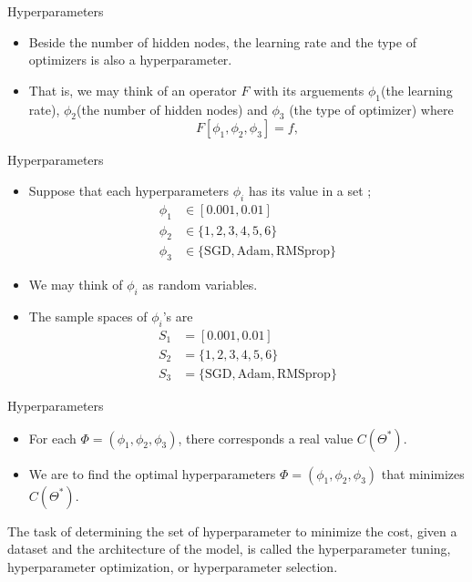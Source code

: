 \documentclass{beamer}
\begin{document}
%
\begin{frame}{Hyperparameters}
\begin{itemize}
\item
Beside the number of hidden nodes, the \alert{learning rate} and the \alert{type of optimizers} is also a hyperparameter.
\item
That is, we may think of an operator \(F\) with its arguements \(\phi_1\)(the learning rate), \(\phi_2\)(the number of hidden nodes) and \(\phi_3\) (the type of optimizer) where
\[F[\phi_1,\phi_2,\phi_3]=f,\]
\end{itemize}
\end{frame}

%
\begin{frame}{Hyperparameters}
\begin{itemize}
\item
Suppose that each hyperparameters \(\phi_i\) has its value in a set ;
\begin{align*}
\phi_1&\in[0.001,0.01]\\
\phi_2&\in\{1,2,3,4,5,6\}\\
\phi_3&\in\{\text{SGD},\text{Adam},\text{RMSprop}\}
\end{align*}
\item
We may think of \(\phi_i\) as random variables.
\item
The sample spaces of \(\phi_i\)'s are
\begin{align*}
S_1&=[0.001,0.01]\\
S_2&=\{1,2,3,4,5,6\}\\
S_3&=\{\text{SGD},\text{Adam},\text{RMSprop}\}
\end{align*}
\end{itemize}
\end{frame}

%
\begin{frame}{Hyperparameters}
\begin{itemize}
\item
For each \(\Phi=(\phi_1,\phi_2,\phi_3)\), there corresponds a real value \(C(\Theta^*)\).
\item
We are to find the optimal hyperparameters \(\Phi=(\phi_1,\phi_2,\phi_3)\) that minimizes \(C(\Theta^*)\).
\end{itemize}

\bigskip
The task of determining the set of hyperparameter to minimize the cost, given a dataset and the architecture of the model, is called
the \alert{hyperparameter tuning},
hyperparameter optimization, or
hyperparameter selection.
\end{frame}
\end{document}
